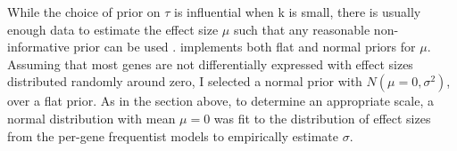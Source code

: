 While the choice of prior on $\tau$ is influential when k is small, there is usually enough data to estimate the effect size $\mu$ such that any reasonable non-informative prior can be used \autocite{gelman2006PriorDistributionsVariance,friede2017MetaanalysisFewSmall}.
 implements both flat and normal priors for $\mu$.
%
Assuming that most genes are not differentially expressed with effect sizes distributed randomly around zero, I selected a normal prior with $N(\mu=0, \sigma^2)$, over a flat prior. As in the section above, to determine an appropriate scale, a normal distribution with mean $\mu = 0$ was fit to the distribution of effect sizes from the per-gene frequentist models to empirically estimate $\sigma$.

